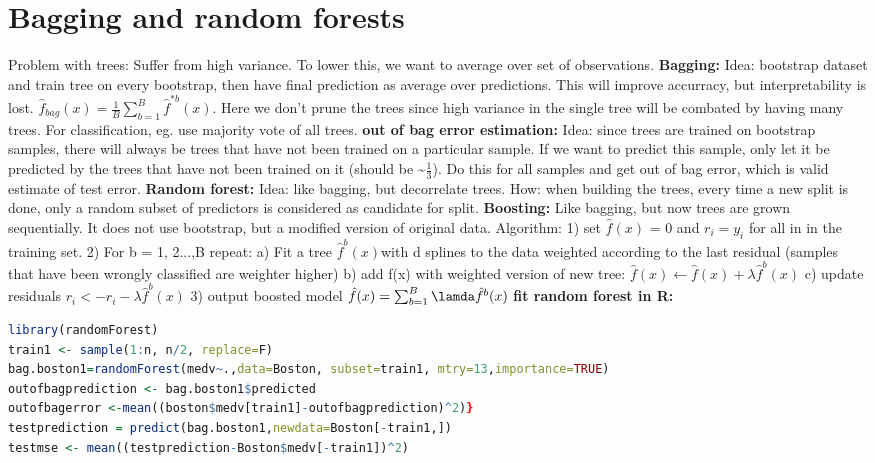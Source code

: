 \section{Bagging and random forests}
Problem with trees: Suffer from high variance. To lower this, we want to average over set of observations. 
\textbf{Bagging: } Idea: bootstrap dataset and train tree on every bootstrap, then have final prediction as average over predictions. This will improve accurracy, but interpretability is lost. $\hat f_{bag}(x)= \frac{1}{B} \sum_{b=1}^B \hat f^{*b}(x)$. Here we don't prune the trees since high variance in the single tree will be combated by having many trees. For classification, eg. use majority vote of all trees.
\textbf{out of bag error estimation: } Idea: since trees are trained on bootstrap samples, there will always be trees that have not been trained on a particular sample. If we want to predict this sample, only let it be predicted by the trees that have not been trained on it (should be \textasciitilde $\frac{1}{3}$). Do this for all samples and get out of bag error, which is valid estimate of test error. 
\textbf{Random forest: } Idea: like bagging, but decorrelate trees. How: when building the trees, every time a new split is done, only a random subset of predictors is considered as candidate for split. 
\textbf{Boosting: } Like bagging, but now trees are grown sequentially. It does not use bootstrap, but a modified version of original data. Algorithm: 
1) set $\hat f(x)$ = 0 and $r_i = y_i$ for all in in the training set.
2) For b = 1, 2...,B repeat:
a) Fit a tree $\hat f^b(x)$with d splines to the data weighted according to the last residual (samples that have been wrongly classified are weighter higher)
b) add f(x) with weighted version of new tree: $ \hat f(x) \leftarrow \hat f(x) + \lambda \hat f^b(x) $
c) update residuals $r_i <- r_i - \lambda \hat f^b(x)$
3) output boosted model $\hat f(x) = \sum_{b=1}^B \lamda \hat f^b(x)$
\textbf{fit random forest in R: } \begin{lstlisting}[language = R]
library(randomForest)
train1 <- sample(1:n, n/2, replace=F)
bag.boston1=randomForest(medv~.,data=Boston, subset=train1, mtry=13,importance=TRUE)
outofbagprediction <- bag.boston1$predicted
outofbagerror <-mean((boston$medv[train1]-outofbagprediction)^2)}
testprediction = predict(bag.boston1,newdata=Boston[-train1,])
testmse <- mean((testprediction-Boston$medv[-train1])^2) \end{lstlisting}